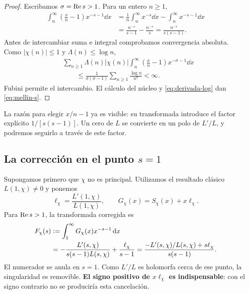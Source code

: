 \begin{proof}
Escribamos $\sigma=\operatorname{Re} s>1$. Para un entero $n\ge1$,
\begin{align*}
\int_n^\infty\left(\frac{x}{n}-1\right)x^{-s-1}\dd x
 &=\frac1n\int_n^\infty x^{-s}\dd x
      -\int_n^\infty x^{-s-1}\dd x\\
 &=\frac{n^{-s}}{s-1}-\frac{n^{-s}}s
  =\frac{n^{-s}}{s(s-1)}.
\end{align*}
Antes de intercambiar suma e integral comprobamos convergencia absoluta.
Como $|\chi(n)|\le1$ y $\Lambda(n)\le\log n$,
\begin{align*}
&\sum_{n\ge1}\Lambda(n)|\chi(n)|
  \int_n^\infty\left(\frac{x}{n}-1\right)x^{-\sigma-1}\dd x\\
&\hspace{2em}\le
 \frac{1}{\sigma(\sigma-1)}
 \sum_{n\ge1}\frac{\log n}{n^\sigma}<\infty.
\end{align*}
Fubini permite el intercambio. El cálculo del núcleo y
\eqref{eq:derivada-log} dan \eqref{eq:mellin-s}.
\end{proof}

La razón para elegir $x/n-1$ ya es visible: su transformada introduce el
factor explícito $1/[s(s-1)]$. Un cero de $L$ se convierte en un polo de
$L'/L$, y podremos seguirlo a través de este factor.

\subsection{La corrección en el punto \texorpdfstring{$s=1$}{s=1}}

Supongamos primero que $\chi$ no es principal. Utilizamos el resultado
clásico $L(1,\chi)\ne0$ y ponemos
\[
  \ell_\chi=\frac{L'(1,\chi)}{L(1,\chi)},\qquad
  G_\chi(x)=S_\chi(x)+x\ell_\chi.
\]
Para $\operatorname{Re} s>1$, la transformada corregida es
\begin{align}
F_\chi(s)
  &:=\int_1^\infty G_\chi(x)x^{-s-1}\,\mathrm{d} x\notag\\
  &=-\frac{L'(s,\chi)}{s(s-1)L(s,\chi)}
      +\frac{\ell_\chi}{s-1}
   =\frac{-L'(s,\chi)/L(s,\chi)+s\ell_\chi}{s(s-1)}.
   \label{eq:mellin-g}
\end{align}
El numerador se anula en $s=1$. Como $L'/L$ es holomorfa cerca de ese
punto, la singularidad es removible. \textbf{El signo positivo de
$x\ell_\chi$ es indispensable}: con el signo contrario no se produciría
esta cancelación.

